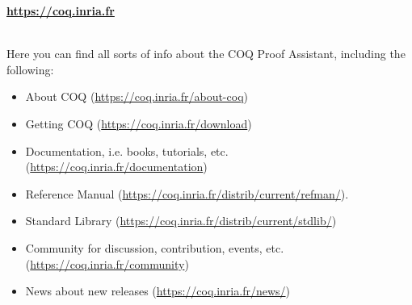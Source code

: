 {\bf \url{https://coq.inria.fr}}

~\\
Here you can find all sorts of info about the COQ Proof Assistant, including the following: 

\begin{itemize}
\item About COQ (\url{https://coq.inria.fr/about-coq})

\item Getting COQ (\url{https://coq.inria.fr/download})

\item Documentation, i.e. books, tutorials, etc. (\url{https://coq.inria.fr/documentation})

\item Reference Manual (\url{https://coq.inria.fr/distrib/current/refman/}). 

\item Standard Library (\url{https://coq.inria.fr/distrib/current/stdlib/})

\item Community for discussion, contribution, events, etc. (\url{https://coq.inria.fr/community})

\item News about new releases (\url{https://coq.inria.fr/news/})

\end{itemize}












